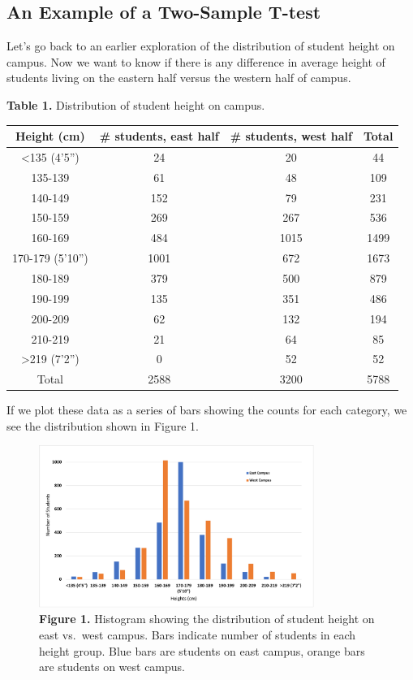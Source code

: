 \documentclass[
]{book}
\begin{document}
\hypertarget{an-example-of-a-two-sample-t-test}{%
\subsection{An Example of a Two-Sample T-test}\label{an-example-of-a-two-sample-t-test}}

Let's go back to an earlier exploration of the distribution of student height on campus. Now we want to know if there is any difference in average height of students living on the eastern half versus the western half of campus.

\textbf{Table 1.} Distribution of student height on campus.

\begin{longtable}[]{@{}cccc@{}}
\toprule
Height (cm) & \# students, east half & \# students, west half & Total \\
\midrule
\endhead
\textless135 (4'5'') & 24 & 20 & 44 \\
135-139 & 61 & 48 & 109 \\
140-149 & 152 & 79 & 231 \\
150-159 & 269 & 267 & 536 \\
160-169 & 484 & 1015 & 1499 \\
170-179 (5'10'') & 1001 & 672 & 1673 \\
180-189 & 379 & 500 & 879 \\
190-199 & 135 & 351 & 486 \\
200-209 & 62 & 132 & 194 \\
210-219 & 21 & 64 & 85 \\
\textgreater219 (7'2'') & 0 & 52 & 52 \\
Total & 2588 & 3200 & 5788 \\
\bottomrule
\end{longtable}

If we plot these data as a series of bars showing the counts for each category, we see the distribution shown in Figure 1.

\begin{figure}
\centering
\includegraphics[width=0.8\textwidth,height=\textheight]{images/Histogram3.png}
\caption{\textbf{Figure 1.} Histogram showing the distribution of student height on east vs.~west campus. Bars indicate number of students in each height group. Blue bars are students on east campus, orange bars are students on west campus.}
\end{figure}
\end{document}
